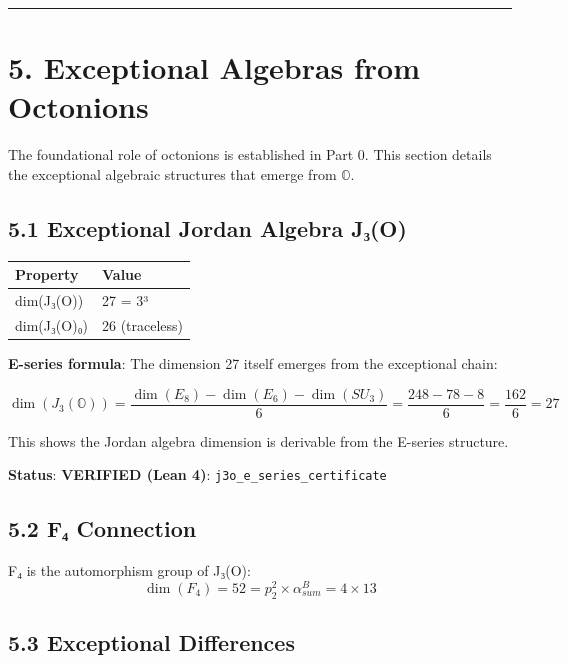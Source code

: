 \documentclass[11pt,a4paper]{article}
\begin{document}
\begin{center}\rule{\linewidth}{0.5pt}\end{center}

\section{5. Exceptional Algebras from Octonions}\label{exceptional-algebras-from-octonions}

The foundational role of octonions is established in Part 0. This section details the exceptional algebraic structures that emerge from \ensuremath{\mathbb{O}}.

\subsection{5.1 Exceptional Jordan Algebra J₃(O)}\label{exceptional-jordan-algebra-jux2083o}

\begin{longtable}[]{@{}ll@{}}
\toprule\noalign{}
Property & Value \\
\midrule\noalign{}
\endhead
\bottomrule\noalign{}
\endlastfoot
dim(J₃(O)) & 27 = 3³ \\
dim(J₃(O)₀) & 26 (traceless) \\
\end{longtable}

\textbf{E-series formula}: The dimension 27 itself emerges from the exceptional chain:

\[\dim(J_3(\mathbb{O})) = \frac{\dim(E_8) - \dim(E_6) - \dim(SU_3)}{6} = \frac{248 - 78 - 8}{6} = \frac{162}{6} = 27\]

This shows the Jordan algebra dimension is derivable from the E-series structure.

\textbf{Status}: \textbf{VERIFIED (Lean 4)}: \texttt{j3o\_\allowbreak{}e\_\allowbreak{}series\_\allowbreak{}certificate}

\subsection{5.2 F₄ Connection}\label{fux2084-connection}

F₄ is the automorphism group of J₃(O): \[\dim(F_4) = 52 = p_2^2 \times \alpha_{sum}^B = 4 \times 13\]

\subsection{5.3 Exceptional Differences}\label{exceptional-differences}
\end{document}
